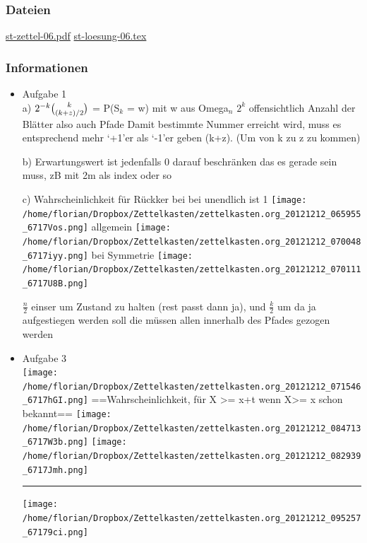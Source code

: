 \documentclass[11pt]{article}
\begin{document}
\subsubsection{Dateien}
\label{sec-3-6-1}

    \href{file:///home/florian/Dropbox/st/st-zettel-06/st-zettel-06.pdf}{st-zettel-06.pdf}
    \href{file:///home/florian/Dropbox/st/st-zettel-06/st-loesung-06.tex}{st-loesung-06.tex}
\subsubsection{Informationen}
\label{sec-3-6-2}
\begin{itemize}

\item Aufgabe 1\\
\label{sec-3-6-2-1}%
a)
$2^{-k}\binom{k}{(k+z)/2}\\$ = P(S$_k$ = w) mit w aus Omega$_n$
$2^{k}$ offensichtlich Anzahl der Blätter also auch Pfade
Damit bestimmte Nummer erreicht wird, muss es entsprechend
mehr `+1'er als `-1'er geben (k+z). (Um von k zu z zu kommen)

b) Erwartungswert ist jedenfalls 0
darauf beschränken das es gerade sein muss, zB mit 2m als index oder so

c) Wahrscheinlichkeit für Rückker bei bei unendlich ist 1
\texttt{[image: /home/florian/Dropbox/Zettelkasten/zettelkasten.org\_20121212\_065955\_6717Vos.png]} allgemein
\texttt{[image: /home/florian/Dropbox/Zettelkasten/zettelkasten.org\_20121212\_070048\_6717iyy.png]} bei Symmetrie
\texttt{[image: /home/florian/Dropbox/Zettelkasten/zettelkasten.org\_20121212\_070111\_6717U8B.png]}

$\frac{n}{2}$ einser um Zustand zu halten (rest passt dann ja),
und $\frac{k}{2}$ um da ja aufgestiegen werden soll
die müssen allen innerhalb des Pfades gezogen werden


\item Aufgabe 3\\
\label{sec-3-6-2-2}%
\texttt{[image: /home/florian/Dropbox/Zettelkasten/zettelkasten.org\_20121212\_071546\_6717hGI.png]}
==Wahrscheinlichkeit, für X >= x+t wenn X>= x schon bekannt==
\texttt{[image: /home/florian/Dropbox/Zettelkasten/zettelkasten.org\_20121212\_084713\_6717W3b.png]}
\texttt{[image: /home/florian/Dropbox/Zettelkasten/zettelkasten.org\_20121212\_082939\_6717Jmh.png]}

\hrule

\texttt{[image: /home/florian/Dropbox/Zettelkasten/zettelkasten.org\_20121212\_095257\_67179ci.png]}

\end{itemize} %
\end{document}
